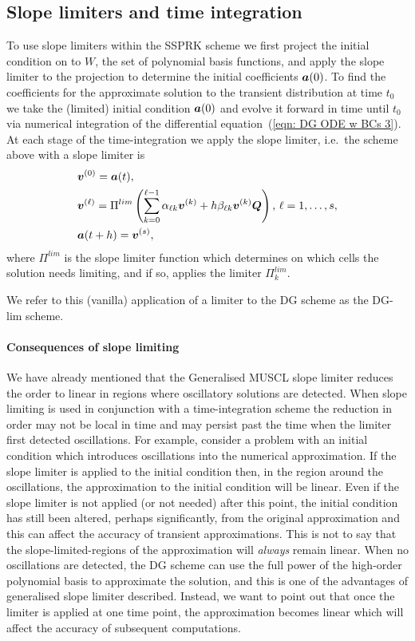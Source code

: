 \subsection{Slope limiters and time integration}\label{subsec: slope lim and int}
To use slope limiters within the SSPRK scheme we first project the initial condition on to \(W\), the set of polynomial basis functions, and apply the slope limiter to the projection to determine the initial coefficients \(\boldsymbol a(0)\). To find the coefficients for the approximate solution to the transient distribution at time \(t_0\) we take the (limited) initial condition \(\boldsymbol a(0)\) and evolve it forward in time until \(t_0\) via numerical integration of the differential equation~(\ref{eqn: DG ODE w BCs 3}). At each stage of the time-integration we apply the slope limiter, i.e.~the scheme above with a slope limiter is 
\begin{align*}
	&\boldsymbol v^{(0)} = \boldsymbol a(t),\\
	&\boldsymbol v^{(\ell)} = \Pi^{lim}\left(\sum_{k=0}^{\ell-1} \alpha_{\ell k}\boldsymbol v^{(k)} + h\beta_{\ell k}  \boldsymbol v^{(k)}\boldsymbol Q\right),\, \ell = 1,\dots,s,\\
	&\boldsymbol a(t+h) =\boldsymbol v^{(s)},
\end{align*} 
where \(\Pi^{lim}\) is the slope limiter function which determines on which cells the solution needs limiting, and if so, applies the limiter \(\Pi_k^{lim}\). 

We refer to this (vanilla) application of a limiter to the DG scheme as the DG-lim scheme. 

\paragraph{Consequences of slope limiting} We have already mentioned that the Generalised MUSCL slope limiter reduces the order to linear in regions where oscillatory solutions are detected. When slope limiting is used in conjunction with a time-integration scheme the reduction in order may not be local in time and may persist past the time when the limiter first detected oscillations. For example, consider a problem with an initial condition which introduces oscillations into the numerical approximation. If the slope limiter is applied to the initial condition then, in the region around the oscillations, the approximation to the initial condition will be linear. Even if the slope limiter is not applied (or not needed) after this point, the initial condition has still been altered, perhaps significantly, from the original approximation and this can affect the accuracy of transient approximations. This is not to say that the slope-limited-regions of the approximation will \emph{always} remain linear. When no oscillations are detected, the DG scheme can use the full power of the high-order polynomial basis to approximate the solution, and this is one of the advantages of generalised slope limiter described. Instead, we want to point out that once the limiter is applied at one time point, the approximation becomes linear which will affect the accuracy of subsequent computations. 

